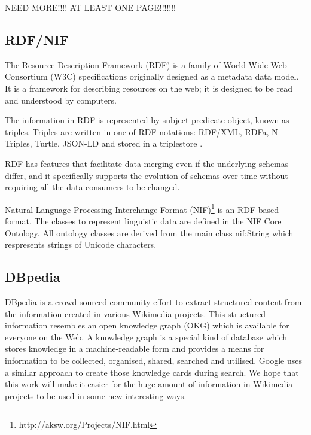 \documentclass[thesis=M,english]{FITthesis}[2018/05/30]
\begin{document}
NEED MORE!!!! AT LEAST ONE PAGE!!!!!!!

\subsection{RDF/NIF}
	The Resource Description Framework (RDF)\cite{wiki:RDF} is a family of World Wide Web Consortium (W3C) specifications originally designed as a metadata data model.  It is a framework for describing resources on the web; it is designed to be read and understood by computers.
	
	The information in RDF is represented by subject-predicate-object, known as triples. Triples are written in one of RDF notations: RDF/XML, RDFa, N-Triples, Turtle, JSON-LD and stored in a triplestore \cite{master:SPARQL}.
	
	
	RDF \cite{w3c:RDF} has features that facilitate data merging even if the underlying schemas differ, and it specifically supports the evolution of schemas over time without requiring all the data consumers to be changed.

	Natural Language Processing Interchange Format (NIF)\footnote{http://aksw.org/Projects/NIF.html} \cite{w3c:NIF} is an RDF-based format. The classes to represent linguistic data are defined in the NIF Core Ontology. All ontology classes are derived from the main class nif:String which respresents strings of Unicode characters.

\subsection{DBpedia}
DBpedia \cite{dbpedia:core} is a crowd-sourced community effort to extract structured content from the information created in various Wikimedia projects. This structured information resembles an open knowledge graph (OKG) which is available for everyone on the Web. A knowledge graph is a special kind of database which stores knowledge in a machine-readable form and provides a means for information to be collected, organised, shared, searched and utilised. Google uses a similar approach to create those knowledge cards during search. We hope that this work will make it easier for the huge amount of information in Wikimedia projects to be used in some new interesting ways. 
\end{document}
